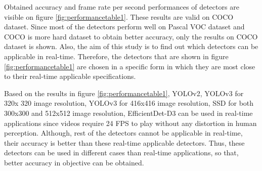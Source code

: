 \documentclass{article}
\begin{document}
\setlength{\parindent}{6ex}

\indent

Obtained accuracy and frame rate per second performances of detectors are visible 
on figure \ref{fig:performancetable1}. These results are valid on COCO dataset. 
Since most of the detectors perform well on Pascal VOC dataset and COCO is more hard 
dataset to obtain better accuracy, only the results on COCO dataset is shown. Also, 
the aim of this study is to find out which detectors can be applicable in real-time. 
Therefore, the detectors that are shown in figure \ref{fig:performancetable1} 
are chosen in a specific form in which they are most close to their real-time 
applicable specifications. \par

Based on the results in figure \ref{fig:performancetable1}, YOLOv2, YOLOv3 for 320x
320 image resolution, YOLOv3 for 416x416 image resolution, SSD for both 300x300 and 
512x512 image resolution, EfficientDet-D3 can be used in real-time applications since 
videos require 24 FPS to play without any distortion in human perception. Although, 
rest of the detectors cannot be applicable in real-time, their accuracy is better 
than these real-time applicable detectors. Thus, these detectors can be used in 
different cases than real-time applications, so that, better accuracy in objective 
can be obtained. 
\end{document}
